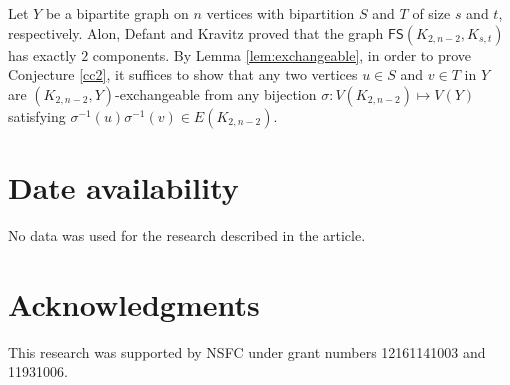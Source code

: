 \documentclass[11pt]{article}
\newcommand{\FS}{\mathsf{FS}}
\begin{document}
 Let $Y$ be a bipartite graph on $n$ vertices with bipartition $S$ and $T$ of size $s$ and $t$, respectively.
 Alon, Defant and Kravitz \cite{ADK} proved that the graph $\FS(K_{2,n-2},K_{s,t})$ has exactly $2$ components. By Lemma \ref{lem:exchangeable}, in order to prove Conjecture \ref{cc2}, it suffices to show that any two vertices $u\in S$ and $v\in T$ in $Y$ are $(K_{2,n-2},Y)$-exchangeable from any bijection $\sigma: V(K_{2,n-2}) \mapsto V(Y)$ satisfying $\sigma^{-1}(u) \sigma^{-1}(v) \in E(K_{2,n-2})$.
 


\section*{Date availability}

No data was used for the research described in the article.

\section*{Acknowledgments}

 This research was supported by NSFC under grant numbers  12161141003 and 11931006.  
\end{document}
